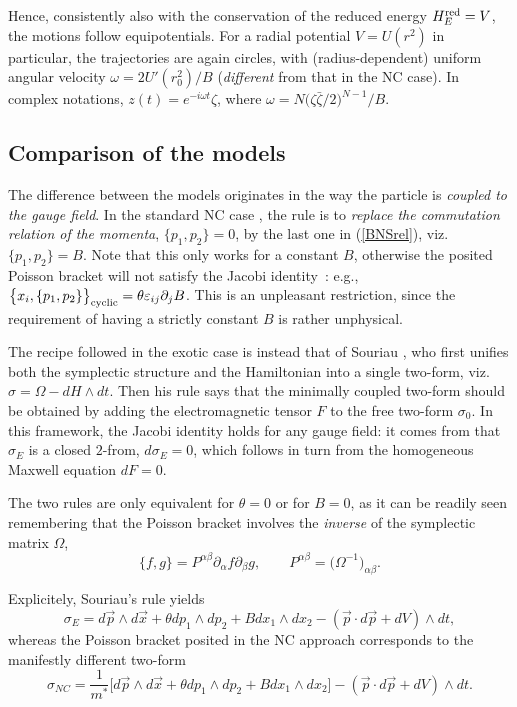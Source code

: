 \documentclass[a4paper,11pt]{article}
\newcommand{\vx}{{\vec x}}
\newcommand{\red}{{\rm red}}
\def\p{{\partial}}
\def\vp{{\vec p}}
\def\vx{{\vec x}}
\begin{document}
Hence, consistently also with the conservation of the reduced energy
$H_{E}^{\red}=V$, the motions follow equipotentials.
For a radial potential $V=U(r^2)$ in particular, the trajectories are
again circles,
with (radius-dependent) uniform angular velocity $\omega=2U'(r_{0}^2)/B$
({\it different} from that in the NC case). In complex notations,
$z(t)=e^{-i\omega t}\zeta$, where
$
\omega=N\big(\zeta\bar{\zeta}/2\big)^{N-1}/{B}.
$

\subsection{Comparison of the models}

The difference between the models originates in the way the particle
is {\it coupled to the gauge field}.
In the standard NC case \cite{BNS, NaPo}, the rule is to {\it replace the
  commutation relation  of the momenta},
  $\{p_{1}, p_{2}\}=0$, by
  the last one in (\ref{BNSrel}),  viz. $\{p_{1}, p_{2}\}=B$.
  Note that this only works for a
  constant $B$, otherwise the posited Poisson bracket
  will not satisfy the Jacobi identity~: e.g.,
  $\big\{x_{i},\{p_{1},p_{2}\}\big\}_{\rm
cyclic}=\theta\varepsilon_{ij}\p_{j}B$.
  This is an unpleasant restriction, since the requirement
  of having a strictly constant $B$ is rather unphysical.

  The  recipe followed in the exotic case is instead that of
  Souriau \cite{SSD}, who first unifies both the symplectic structure
  and the Hamiltonian into a single two-form, viz.
  $\sigma=\Omega-dH\wedge dt$. Then his rule says that
  the minimally coupled
  two-form should be obtained by adding the electromagnetic tensor
  $F$ to the free two-form $\sigma_{0}$.
  In this framework, the Jacobi identity holds
for any gauge field: it comes from that $\sigma_{E}$ is a closed
$2$-from, $d\sigma_{E}=0$,  which follows in turn
from the homogeneous Maxwell equation $dF=0$.


The two rules are only equivalent for $\theta=0$ or for $B=0$,
as it can be readily seen remembering that
the Poisson bracket involves the {\it inverse}
of the  symplectic matrix $\Omega$,
\begin{equation}
     \{f,g\}=P^{\alpha\beta}\p_{\alpha}f\p_{\beta}g,
     \qquad
     P^{\alpha\beta}=\big(\Omega^{-1}\big)_{\alpha\beta}.
     \label{PBdef}
\end{equation}

  Explicitely, Souriau's rule yields
  \begin{equation}
      \sigma_{E}=d\vp\wedge d\vx+\theta dp_{1}\wedge dp_{2} +
     B dx_{1}\wedge dx_{2}-(\vp\cdot d\vp+dV)\wedge dt,
     \label{Esigma}
\end{equation}
whereas the Poisson bracket posited in the NC approach
  corresponds to the manifestly different two-form
  \begin{equation}
      \sigma_{NC}=
      \frac{1}{m^*}
      \Big[d\vp\wedge d\vx+\theta dp_{1}\wedge dp_{2} +
     B dx_{1}\wedge dx_{2}\Big]
     -(\vp\cdot d\vp+dV)\wedge dt.
     \label{NCsigma}
\end{equation}
\goodbreak
\end{document}
